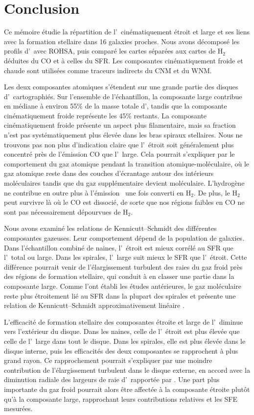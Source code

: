 \chapter[Conclusion]{Conclusion}
\label{Chap:Conclusion}

Ce mémoire étudie la répartition de l'\HI\ cinématiquement étroit et large et ses liens avec la formation stellaire dans 16 galaxies proches. Nous avons décomposé les profils d'\HI\ avec ROHSA, puis comparé les cartes séparées aux cartes de H$_2$ déduites du CO et à celles du SFR. Les composantes cinématiquement froide et chaude sont utilisées comme traceurs indirects du CNM et du WNM.

Les deux composantes atomiques s'étendent sur une grande partie des disques d'\HI\ cartographiés. Sur l'ensemble de l'échantillon, la composante large contribue en médiane à environ 55\% de la masse totale d'\HI, tandis que la composante cinématiquement froide représente les 45\% restants. La composante cinématiquement froide présente un aspect plus filamentaire, mais sa fraction n'est pas systématiquement plus élevée dans les bras spiraux stellaires. Nous ne trouvons pas non plus d'indication claire que l'\HI\ étroit soit généralement plus concentré près de l'émission CO que l'\HI\ large. Cela pourrait s'expliquer par le comportement du gaz atomique pendant la transition atomique-moléculaire, où le gaz atomique reste dans des couches d'écrantage autour des intérieurs moléculaires tandis que du gaz supplémentaire devient moléculaire. L'hydrogène ne contribue en outre plus à l'émission \HI\ une fois converti en H$_2$. De plus, le H$_2$ peut survivre là où le CO est dissocié, de sorte que nos régions faibles en CO ne sont pas nécessairement dépourvues de H$_2$.

Nous avons examiné les relations de Kennicutt--Schmidt des différentes composantes gazeuses. Leur comportement dépend de la population de galaxies. Dans l'échantillon combiné de naines, l'\HI\ étroit est mieux corrélé au SFR que l'\HI\ total ou large. Dans les spirales, l'\HI\ large suit mieux le SFR que l'\HI\ étroit. Cette différence pourrait venir de l'élargissement turbulent des raies du gaz froid près des régions de formation stellaire, qui conduit à en classer une partie dans la composante large. Comme l'ont établi les études antérieures, le gaz moléculaire reste plus étroitement lié au SFR dans la plupart des spirales et présente une relation de Kennicutt--Schmidt approximativement linéaire \citep{Fbigiel2008}.

L'efficacité de formation stellaire des composantes étroite et large de l'\HI\ diminue vers l'extérieur du disque. Dans les naines, celle de l'\HI\ étroit est plus élevée que celle de l'\HI\ large dans tout le disque. Dans les spirales, elle est plus élevée dans le disque interne, puis les efficacités des deux composantes se rapprochent à plus grand rayon. Ce rapprochement pourrait s'expliquer par une moindre contribution de l'élargissement turbulent dans le disque externe, en accord avec la diminution radiale des largeurs de raie d'\HI\ rapportée par \citet{Tamburro2009}. Une part plus importante du gaz froid pourrait alors être affectée à la composante étroite plutôt qu'à la composante large, rapprochant leurs contributions relatives et les SFE mesurées.


